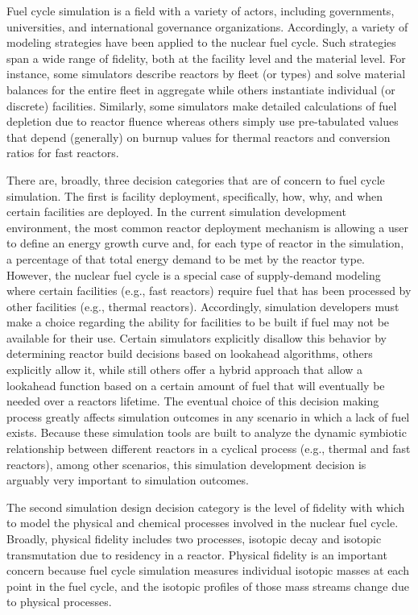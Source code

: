 Fuel cycle simulation is a field with a variety of actors, including
governments, universities, and international governance
organizations. Accordingly, a variety of modeling strategies have been applied
to the nuclear fuel cycle. Such strategies span a wide range of fidelity, both
at the facility level and the material level. For instance, some simulators
describe reactors by fleet (or types) and solve material balances for the entire
fleet in aggregate while others instantiate individual (or discrete)
facilities. Similarly, some simulators make detailed calculations of fuel
depletion due to reactor fluence whereas others simply use pre-tabulated values
that depend (generally) on burnup values for thermal reactors and conversion
ratios for fast reactors.

There are, broadly, three decision categories that are of concern to fuel cycle
simulation. The first is facility deployment, specifically, how, why, and when
certain facilities are deployed. In the current simulation development
environment, the most common reactor deployment mechanism is allowing a user to
define an energy growth curve and, for each type of reactor in the simulation, a
percentage of that total energy demand to be met by the reactor type. However,
the nuclear fuel cycle is a special case of supply-demand modeling where certain
facilities (e.g., fast reactors) require fuel that has been processed by other
facilities (e.g., thermal reactors). Accordingly, simulation developers must
make a choice regarding the ability for facilities to be built if fuel may not
be available for their use. Certain simulators explicitly disallow this behavior
by determining reactor build decisions based on lookahead algorithms, others
explicitly allow it, while still others offer a hybrid approach that allow a
lookahead function based on a certain amount of fuel that will eventually be
needed over a reactors lifetime. The eventual choice of this decision making
process greatly affects simulation outcomes in any scenario in which a lack of
fuel exists. Because these simulation tools are built to analyze the dynamic
symbiotic relationship between different reactors in a cyclical process (e.g.,
thermal and fast reactors), among other scenarios, this simulation development
decision is arguably very important to simulation outcomes.

The second simulation design decision category is the level of fidelity with
which to model the physical and chemical processes involved in the nuclear fuel
cycle. Broadly, physical fidelity includes two processes, isotopic decay and
isotopic transmutation due to residency in a reactor. Physical fidelity is an
important concern because fuel cycle simulation measures individual isotopic
masses at each point in the fuel cycle, and the isotopic profiles of those mass
streams change due to physical processes. 

